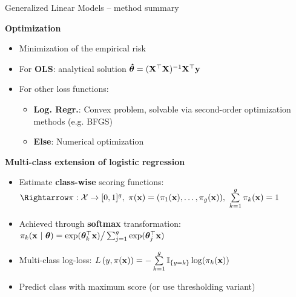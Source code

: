 \documentclass[11pt,compress,t,notes=noshow, xcolor=table]{beamer}
\newcommand{\highlight}[1]{\textcolor{hlcol}{\textbf{#1}}}
\begin{document}
\begin{vbframe}{Generalized Linear Models -- method summary}
\framebreak

\medskip

\highlight{Optimization} 

\begin{itemize}
    \item Minimization of the empirical risk
    \item For \textbf{OLS}: analytical solution $\bm{\hat\theta} = (\mathbf{X}^\top \mathbf{X})^{-1} \mathbf{X}^\top \mathbf{y}$
    \item For other loss functions: 
    \begin{itemize}
        \item \textbf{Log. Regr.}: Convex problem, solvable via second-order optimization methods (e.g. BFGS)
        \item \textbf{Else}: Numerical optimization 
    \end{itemize}
    
\end{itemize}

\medskip



\highlight{Multi-class extension of logistic regression}

\begin{itemize}
  \item Estimate \textbf{class-wise} scoring functions:
  $\Rightarrow \pi: \Xspace \rightarrow \unitint^g, ~
  \pix = (\pikx[1], \dots, \pikx[g]), ~\sumkg \pikx = 1$
  \item Achieved through \textbf{softmax} transformation: 
  $\pi_{k}(\mathbf{x} ~|~ \bm{\theta}) = \exp(\bm{\theta}_k^\top \mathbf{x}) \big/ \sum_{j=1}^g \exp(\bm{\theta}_j^\top 
  \mathbf{x})  $
  \item Multi-class log-loss: $L\left(y, \pi(\mathbf{x})\right) = - \sum\limits_{k=1}^g \mathbb{I}_{\{y = k\}} \log(\pi_{k}(\mathbf{x}))$
  \item Predict class with maximum score (or use thresholding variant)
\end{itemize}

\end{vbframe}
\end{document}
